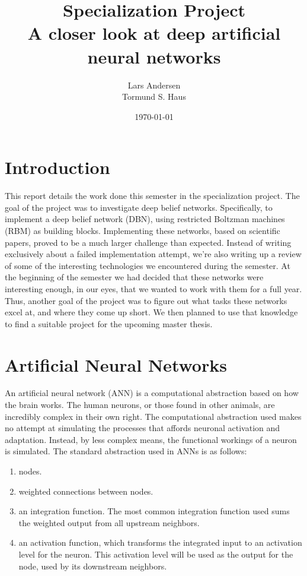\documentclass[11pt]{article}
\title{Specialization Project \\ A closer look at deep artificial neural networks}
\author{Lars Andersen \\
Tormund S. Haus}
\date{\today}
\begin{document}
\maketitle
\newpage
\tableofcontents

\clearpage
\section{Introduction}

This report details the work done this semester in the specialization project.  The goal of the project was to investigate deep belief networks. Specifically, to implement a deep belief network (DBN), using restricted Boltzman machines (RBM) as building blocks.  Implementing these networks, based on scientific papers, proved to be a much larger challenge than expected.  Instead of writing exclusively about a failed implementation attempt, we're also writing up a review of some of the interesting technologies we encountered during the semester.  At the beginning of the semester we had decided that these networks were interesting enough, in our eyes, that we wanted to work with them for a full year.  Thus, another goal of the project was to figure out what tasks these networks excel at, and where they come up short.  We then planned to use that knowledge to find a suitable project for the upcoming master thesis.

\section{Artificial Neural Networks}

An artificial neural network (ANN) is a computational abstraction based on how the brain works.  The human neurons, or those found in other animals, are incredibly complex in their own right.  The computational abstraction used makes no attempt at simulating the processes that affords neuronal activation and adaptation.  Instead, by less complex means, the functional workings of a neuron is simulated.  The standard abstraction used in ANNs is as follows:

\begin{enumerate}
 \item nodes.
 \item weighted connections between nodes.
 \item an integration function.  The most common integration function used sums the weighted output from all upstream neighbors.
 \item an activation function, which transforms the integrated input to an activation level for the neuron.  This activation level will be used as the output for the node, used by its downstream neighbors.
\end{enumerate}
\end{document}
